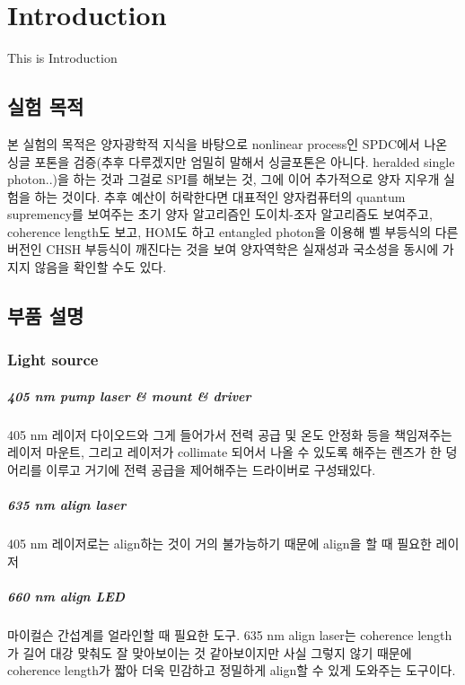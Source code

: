 \chapter{Introduction}
\minitocmargin
This is Introduction


\section{실험 목적}
본 실험의 목적은 양자광학적 지식을 바탕으로 nonlinear process인 SPDC에서 나온 싱글 포톤을 검증(추후 다루겠지만 엄밀히 말해서 싱글포톤은 아니다. heralded single photon..)을 하는 것과 그걸로 SPI를 해보는 것, 그에 이어 추가적으로 양자 지우개 실험을 하는 것이다. 추후 예산이 허락한다면 대표적인 양자컴퓨터의 quantum supremency를 보여주는 초기 양자 알고리즘인 도이치-조자 알고리즘도 보여주고, coherence length도 보고, HOM도 하고 entangled photon을 이용해 벨 부등식의 다른 버전인 CHSH 부등식이 깨진다는 것을 보여 양자역학은 실재성과 국소성을 동시에 가지지 않음을 확인할 수도 있다. \cite{Tufte2006}


\section{부품 설명}
\subsection{Light source}
\paragraph{405 nm pump laser \& mount \& driver}
405 nm 레이저 다이오드와 그게 들어가서 전력 공급 및 온도 안정화 등을 책임져주는 레이저 마운트, 그리고 레이저가 collimate 되어서 나올 수 있도록 해주는 렌즈가 한 덩어리를 이루고 거기에 전력 공급을 제어해주는 드라이버로 구성돼있다.
\paragraph{635 nm align laser}
405 nm 레이저로는 align하는 것이 거의 불가능하기 때문에 align을 할 때 필요한 레이저
\paragraph{660 nm align LED}
마이컬슨 간섭계를 얼라인할 때 필요한 도구. 635 nm align laser는 coherence length가 길어 대강 맞춰도 잘 맞아보이는 것 같아보이지만 사실 그렇지 않기 때문에 coherence length가 짧아 더욱 민감하고 정밀하게 align할 수 있게 도와주는 도구이다.

